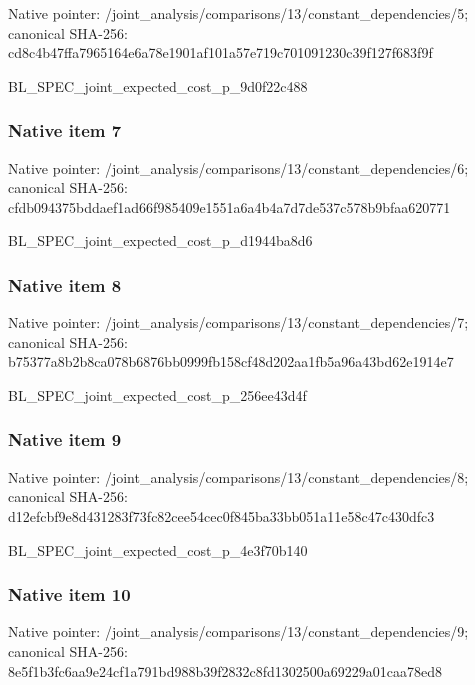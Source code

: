 \documentclass[10pt,a4paper]{article}
\begin{document}
Native pointer: /joint\_analysis/comparis\allowbreak{}ons/13/constant\_dependen\allowbreak{}cies/5; canonical SHA-256: cd8c4b47ffa7965164e6a78e\allowbreak{}1901af101a57e719c7010912\allowbreak{}30c39f127f683f9f


BL\_SPEC\_joint\_expected\_c\allowbreak{}ost\_p\_9d0f22c488


\subsubsection{Native item 7}


Native pointer: /joint\_analysis/comparis\allowbreak{}ons/13/constant\_dependen\allowbreak{}cies/6; canonical SHA-256: cfdb094375bddaef1ad66f98\allowbreak{}5409e1551a6a4b4a7d7de537\allowbreak{}c578b9bfaa620771


BL\_SPEC\_joint\_expected\_c\allowbreak{}ost\_p\_d1944ba8d6


\subsubsection{Native item 8}


Native pointer: /joint\_analysis/comparis\allowbreak{}ons/13/constant\_dependen\allowbreak{}cies/7; canonical SHA-256: b75377a8b2b8ca078b6876bb\allowbreak{}0999fb158cf48d202aa1fb5a\allowbreak{}96a43bd62e1914e7


BL\_SPEC\_joint\_expected\_c\allowbreak{}ost\_p\_256ee43d4f


\subsubsection{Native item 9}


Native pointer: /joint\_analysis/comparis\allowbreak{}ons/13/constant\_dependen\allowbreak{}cies/8; canonical SHA-256: d12efcbf9e8d431283f73fc8\allowbreak{}2cee54cec0f845ba33bb051a\allowbreak{}11e58c47c430dfc3


BL\_SPEC\_joint\_expected\_c\allowbreak{}ost\_p\_4e3f70b140


\subsubsection{Native item 10}


Native pointer: /joint\_analysis/comparis\allowbreak{}ons/13/constant\_dependen\allowbreak{}cies/9; canonical SHA-256: 8e5f1b3fc6aa9e24cf1a791b\allowbreak{}d988b39f2832c8fd1302500a\allowbreak{}69229a01caa78ed8
\end{document}
